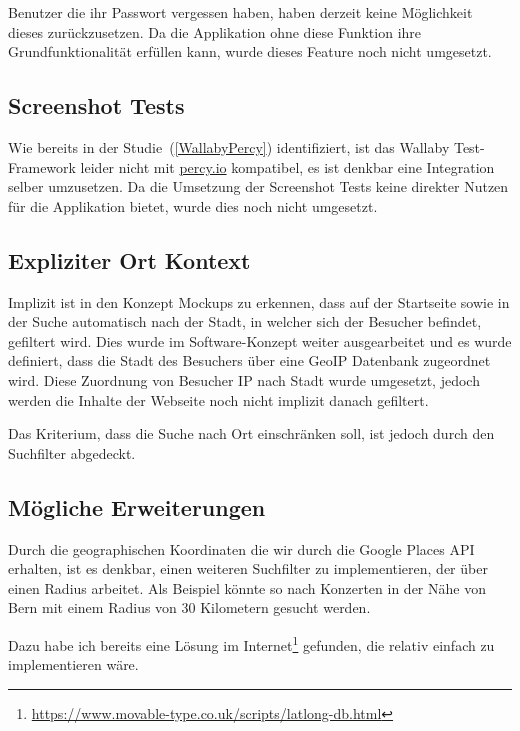Benutzer die ihr Passwort vergessen haben, haben derzeit keine Möglichkeit
dieses zurückzusetzen. Da die Applikation ohne diese Funktion ihre
Grundfunktionalität erfüllen kann, wurde dieses Feature noch nicht umgesetzt.

\subsection{Screenshot Tests}

Wie bereits in der Studie~(\ref{WallabyPercy}) identifiziert, ist das
Wallaby Test-Framework leider nicht mit \href{https://percy.io/}{percy.io}
kompatibel, es ist denkbar eine Integration selber umzusetzen. Da die
Umsetzung der Screenshot Tests keine direkter Nutzen für die Applikation
bietet, wurde dies noch nicht umgesetzt.

\subsection{Expliziter Ort Kontext}

Implizit ist in den Konzept Mockups zu erkennen, dass auf der Startseite sowie
in der Suche automatisch nach der Stadt, in welcher sich der Besucher befindet,
gefiltert wird. Dies wurde im Software-Konzept weiter ausgearbeitet und es wurde
definiert, dass die Stadt des Besuchers über eine GeoIP Datenbank zugeordnet wird.
Diese Zuordnung von Besucher IP nach Stadt wurde umgesetzt, jedoch werden die
Inhalte der Webseite noch nicht implizit danach gefiltert.

Das Kriterium, dass die Suche nach Ort einschränken soll, ist jedoch durch den
Suchfilter abgedeckt.

\clearpage
\subsection{Mögliche Erweiterungen}

Durch die geographischen Koordinaten die wir durch die Google Places API erhalten,
ist es denkbar, einen weiteren Suchfilter zu implementieren, der über einen Radius
arbeitet. Als Beispiel könnte so nach Konzerten in der Nähe von Bern mit einem
Radius von 30 Kilometern gesucht werden.

Dazu habe ich bereits eine Lösung im Internet\footnote{\url{https://www.movable-type.co.uk/scripts/latlong-db.html}}
gefunden, die relativ einfach zu implementieren wäre.
